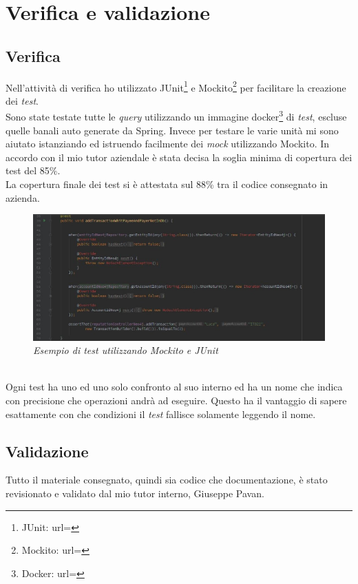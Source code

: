 


\section{Verifica e validazione}
\subsection{Verifica}
Nell'attività di verifica ho utilizzato JUnit\footnote{JUnit: url= } e Mockito\footnote{Mockito: url= } per facilitare la creazione dei \textit{test}.\\
Sono state testate tutte le \textit{query} utilizzando un immagine docker\footnote{Docker: url= } di \textit{test}, escluse quelle banali auto generate da Spring.
Invece per testare le varie unità mi sono aiutato istanziando ed istruendo facilmente dei \textit{mock} utilizzando Mockito.
In accordo con il mio tutor aziendale è stata decisa la soglia minima di copertura dei test del 85\%.\\
La copertura finale dei test si è attestata sul 88\% tra il codice consegnato in azienda.
\begin{figure}[!ht]
	\centering
	\includegraphics[scale=0.4]{immagini/test.jpg}
	\caption{\textit{Esempio di test utilizzando Mockito e JUnit}}
\end{figure}
\\
Ogni test ha uno ed uno solo confronto al suo interno ed ha un nome che indica con precisione che operazioni andrà ad eseguire. Questo ha il vantaggio di sapere esattamente con che condizioni il \textit{test} fallisce solamente leggendo il nome.
\subsection{Validazione}
Tutto il materiale consegnato, quindi sia codice che documentazione, è stato revisionato e validato dal mio tutor interno, Giuseppe Pavan.


